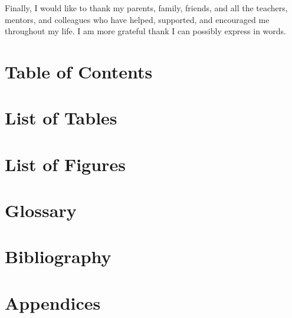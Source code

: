 \documentclass[letterpaper,12pt]{report}
\begin{document}
Finally, I would like to thank my parents, family, friends, and all the teachers, mentors, and colleagues who have helped, supported, and encouraged me throughout my life. I am more grateful thank I can possibly express in words.
\clearpage

\section*{Table of Contents}
\tableofcontents
\clearpage


\section*{List of Tables}
\listoftables
\clearpage

\section*{List of Figures}
\listoffigures
\clearpage

\section*{Glossary}

\clearpage

\setcounter{page}{1}

\clearpage
{}\clearpage
{}\clearpage
{}\clearpage
{}\clearpage
{}\clearpage
{}\clearpage

\section{Bibliography}
\label{sec:bibliography}
\clearpage

\section{Appendices}
\label{sec:appendices}
\clearpage
\end{document}
